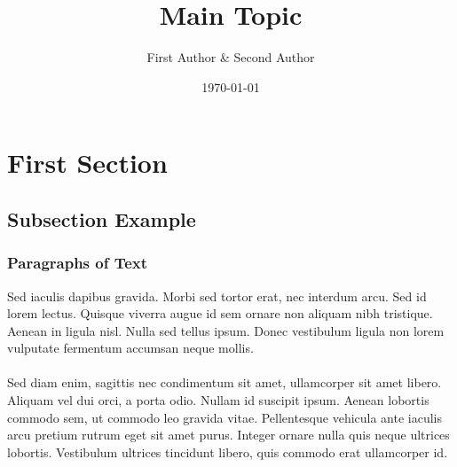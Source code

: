 \documentclass[aspectratio=169]{beamer}
\title{\huge Main Topic}
\author{First Author \& Second Author}
\institute{Food and Resource Economics Department}
\date{\today}
\begin{document}
\begin{frame}[plain]
    \titlepage
\end{frame}




\section{First Section} %

\subsection{Subsection Example} %


\begin{frame}
\frametitle{Paragraphs of Text}
Sed iaculis dapibus gravida. Morbi sed tortor erat, nec interdum arcu. Sed id lorem lectus. Quisque viverra augue id sem ornare non aliquam nibh tristique. Aenean in ligula nisl. Nulla sed tellus ipsum. Donec vestibulum ligula non lorem vulputate fermentum accumsan neque mollis.\\~\\

Sed diam enim, sagittis nec condimentum sit amet, ullamcorper sit amet libero. Aliquam vel dui orci, a porta odio. Nullam id suscipit ipsum. Aenean lobortis commodo sem, ut commodo leo gravida vitae. Pellentesque vehicula ante iaculis arcu pretium rutrum eget sit amet purus. Integer ornare nulla quis neque ultrices lobortis. Vestibulum ultrices tincidunt libero, quis commodo erat ullamcorper id.
\end{frame}
\end{document}
